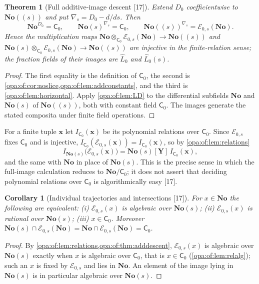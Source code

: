\documentclass[11pt,oneside]{article}
\numberwithin{equation}{section}
\newtheorem{theorem}{Theorem}[section]
\newtheorem{corollary}[corollary]{Corollary}
\theoremstyle{definition}
\theoremstyle{remark}
\newcommand{\No}{\mathbf{No}}
\newcommand{\EE}{\mathcal E}
\newcommand{\src}[1]{\textup{\textsf{\small[#1]}}}
\begin{document}
\begin{theorem}[Full additive-image descent \src{17}]\label{opa:of:thm:adddescent}
Extend $D_0$ coefficientwise to $\No((s))$ and put $\nabla_{\!s}=D_0-d/ds$. Then
\begin{equation}\label{opa:of:eq:constFs}
 \No^{D_0}=\mathsf C_0,\qquad \No(s)^{\nabla_{\!s}}=\mathsf C_0,\qquad \No((s))^{\nabla_{\!s}}=\EE_{0,s}(\No).
\end{equation}
Hence the multiplication maps $\No\otimes_{\mathsf C_0}\EE_{0,s}(\No)\to\No((s))$ and
$\No(s)\otimes_{\mathsf C_0}\EE_{0,s}(\No)\to\No((s))$ are injective in the finite-relation sense; the fraction fields of their
images are $\widehat L_0$ and $\widehat L_0(s)$.
\end{theorem}
\begin{proof}
The first equality is the definition of $\mathsf C_0$, the second is \cref{opa:of:cor:noslice,opa:of:lem:addconstants}, and the
third is \cref{opa:of:lem:horizontal}. Apply \cref{opa:of:lem:LD} to the differential subfields $\No$ and $\No(s)$ of
$\No((s))$, both with constant field $\mathsf C_0$. The images generate the stated composita under finite field operations.
\end{proof}

For a finite tuple $\mathbf x$ let $I_{\mathsf C_0}(\mathbf x)$ be its polynomial relations over $\mathsf C_0$. Since $\EE_{0,s}$ fixes
$\mathsf C_0$ and is injective, $I_{\mathsf C_0}(\EE_{0,s}(\mathbf x))=I_{\mathsf C_0}(\mathbf x)$, so by \cref{opa:of:lem:relations}
\begin{equation}\label{opa:of:eq:fullidealadd}
 I_{\No(s)}\bigl(\EE_{0,s}(\mathbf x)\bigr)=\No(s)[\mathbf Y]\,I_{\mathsf C_0}(\mathbf x),
\end{equation}
and the same with $\No$ in place of $\No(s)$. This is the precise sense in which the full-image calculation reduces to
$\No/\mathsf C_0$; it does not assert that deciding polynomial relations over $\mathsf C_0$ is algorithmically easy \src{17}.

\begin{corollary}[Individual trajectories and intersections \src{17}]\label{opa:of:cor:addalg}
For $x\in\No$ the following are equivalent: \textup{(i)} $\EE_{0,s}(x)$ is algebraic over $\No(s)$; \textup{(ii)} $\EE_{0,s}(x)$
is rational over $\No(s)$; \textup{(iii)} $x\in\mathsf C_0$. Moreover $\No(s)\cap\EE_{0,s}(\No)=\No\cap\EE_{0,s}(\No)=\mathsf C_0$.
\end{corollary}
\begin{proof}
By \cref{opa:of:lem:relations,opa:of:thm:adddescent}, $\EE_{0,s}(x)$ is algebraic over $\No(s)$ exactly when $x$ is algebraic
over $\mathsf C_0$, that is $x\in\mathsf C_0$ (\cref{opa:of:lem:relalg}); such an $x$ is fixed by $\EE_{0,s}$ and lies in $\No$. An
element of the image lying in $\No(s)$ is in particular algebraic over $\No(s)$.
\end{proof}
\end{document}
